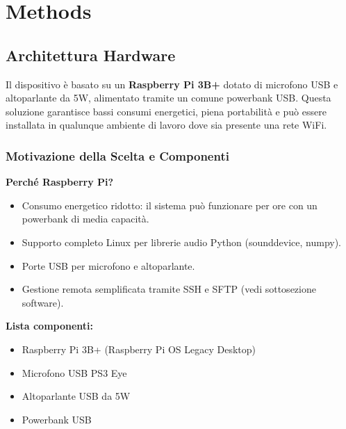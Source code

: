 \documentclass[fleqn,10pt]{SelfArx} %
\begin{document}


\section{Methods}


\subsection{Architettura Hardware}

Il dispositivo è basato su un \textbf{Raspberry Pi 3B+} dotato di microfono USB e altoparlante da 5W, alimentato tramite un comune powerbank USB.  
Questa soluzione garantisce bassi consumi energetici, piena portabilità e può essere installata in qualunque ambiente di lavoro dove sia presente una rete WiFi.

\subsubsection{Motivazione della Scelta e Componenti}

\textbf{Perché Raspberry Pi?}
\begin{itemize}
	\item Consumo energetico ridotto: il sistema può funzionare per ore con un powerbank di media capacità.
	\item Supporto completo Linux per librerie audio Python (sounddevice, numpy).
	\item Porte USB per microfono e altoparlante.
	\item Gestione remota semplificata tramite SSH e SFTP (vedi sottosezione software).
\end{itemize}

\textbf{Lista componenti:}
\begin{itemize}
	\item Raspberry Pi 3B+ (Raspberry Pi OS Legacy Desktop)
	\item Microfono USB PS3 Eye
	\item Altoparlante USB da 5W
	\item Powerbank USB
\end{itemize}
\end{document}
